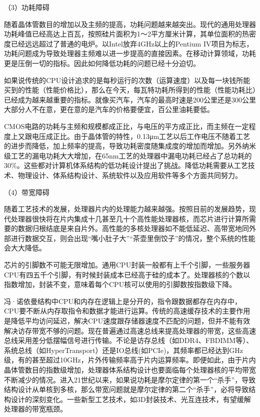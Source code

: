 \documentclass[]{ctexbook}
\begin{document}
（3）功耗障碍

随着晶体管数目的增加以及主频的提高，功耗问题越来越突出。现代的通用处理器功耗峰值已经高达上百瓦，按照硅片面积为1～2平方厘米计算，其单位面积的热密度已经远远超过了普通的电炉。以Intel放弃4GHz以上的Pentium IV项目为标志，功耗问题成为导致处理器主频难以进一步提高的直接因素。在移动计算领域，功耗更是压倒一切的指标。因此如何降低功耗的问题已经十分迫切。

如果说传统的CPU设计追求的是每秒运行的次数（运算速度）以及每一块钱所能买到的性能（性能价格比），那么在今天，每瓦特功耗所得到的性能（性能功耗比）已经成为越来越重要的指标。就像买汽车，汽车的最高时速是200公里还是300公里大部分人不在意，更在意的是汽车的价格要便宜，百公里油耗要低。

CMOS电路的功耗与主频和规模都成正比，与电压的平方成正比，而主频在一定程度上又跟电压成正比。由于晶体管的特性，0.13μm工艺以后工作电压不随着工艺的进步而降低，加上频率的提高，导致功耗密度随集成度的增加而增加。另外纳米级工艺的漏电功耗大大增加，在65nm工艺的处理器中漏电功耗已经占了总功耗的30\%。这些都对计算机体系结构的低功耗设计提出了挑战。降低功耗需要从工艺技术、物理设计、体系结构设计、系统软件以及应用软件等多个方面共同努力。

（4）带宽障碍

随着工艺技术的发展，处理器片内的处理能力越来越强。按照目前的发展趋势，现代处理器很快将在片内集成十几甚至几十个高性能处理器核，而芯片进行计算所需要的数据归根结底是来自片外。高性能的多核处理器如不能低延迟、高带宽地同外部进行数据交互，则会出现``嘴小肚子大''``茶壶里倒饺子''的情况，整个系统的性能会大大降低。

芯片的引脚数不可能无限增加。通用CPU封装一般都有上千个引脚，一些服务器CPU有四五千个引脚，有时候封装成本已经高于硅的成本了。处理器核的个数以指数增加，封装不变，意味着每个CPU核可以使用的引脚数按指数级下降。

冯·诺依曼结构中CPU和内存在逻辑上是分开的，指令跟数据都存在内存中，CPU要不断从内存取指令和数据才能进行运算。传统的高速缓存技术的主要作用是降低平均访问延迟，解决CPU速度跟存储器速度不匹配的问题，但并不能有效解决访存带宽不够的问题。现在普遍通过高速总线来提高处理器的带宽，这些高速总线采用差分低摆幅信号进行传输。不论是访存总线（如DDR4、FBDIMM等）、系统总线（如HyperTransport）还是IO总线(如PCIe)，其频率都已经达到GHz级，有的甚至超过10GHz，片外传输频率高于片内运算频率。即便如此，由于片内晶体管数目的指数级增加，处理器体系结构设计也要面临每个处理器核的平均带宽不断减少的情况。进入21世纪以来，如果说功耗是摩尔定律的第一个``杀手''，导致结构设计从单核到多核，那么带宽问题就是摩尔定律的第二个``杀手''，必将导致结构设计的深刻变化。一些新型工艺技术，如3D封装技术、光互连技术，有望缓解处理器的带宽瓶颈。
\end{document}
